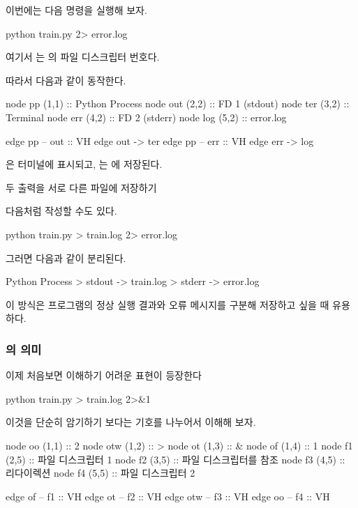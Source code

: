 이번에는 다음 명령을 실행해 보자.

\begin{dhkzsh}
python train.py 2> error.log
\end{dhkzsh}

여기서 는 의 파일 디스크립터 번호다.

따라서 다음과 같이 동작한다.

\begin{dhkdiagram}[in=6]
node pp (1,1) :: Python Process
node out (2,2) :: FD 1 (stdout)
node ter (3,2) :: Terminal
node err (4,2) :: FD 2 (stderr)
node log (5,2) :: error.log

edge pp -- out :: VH
edge out -> ter
edge pp -- err :: VH
edge err -> log
\end{dhkdiagram}

은 터미널에 표시되고, 는 에 저장된다.

\begin{dhknote}
\begin{dhksmry}[centered]
두 출력을 서로 다른 파일에 저장하기
\end{dhksmry}
\end{dhknote}

다음처럼 작성할 수도 있다.

\begin{dhkzsh}
python train.py > train.log 2> error.log
\end{dhkzsh}

그러면 다음과 같이 분리된다.

\begin{dhkdir}
Python Process
> stdout -> train.log
> stderr -> error.log
\end{dhkdir}

이 방식은 프로그램의 정상 실행 결과와 오류 메시지를 구분해 저장하고 싶을 때 유용하다.

\subsubsection{의 의미}

이제 처음보면 이해하기 어려운 표현이 등장한다

\begin{dhkzsh}
python train.py > train.log 2>&1
\end{dhkzsh}

이것을 단순히 암기하기 보다는 기호를 나누어서 이해해 보자.

\begin{dhkdiagram}
node oo (1,1) :: 2
node otw (1,2) :: >
node ot (1,3) :: &
node of (1,4) :: 1
node f1 (2,5) :: 파일 디스크립터 1
node f2 (3,5) :: 파일 디스크립터를 참조
node f3 (4,5) :: 리다이렉션
node f4 (5,5) :: 파일 디스크립터 2

edge of -- f1 :: VH
edge ot -- f2 :: VH
edge otw -- f3 :: VH
edge oo -- f4 :: VH 
\end{dhkdiagram}

